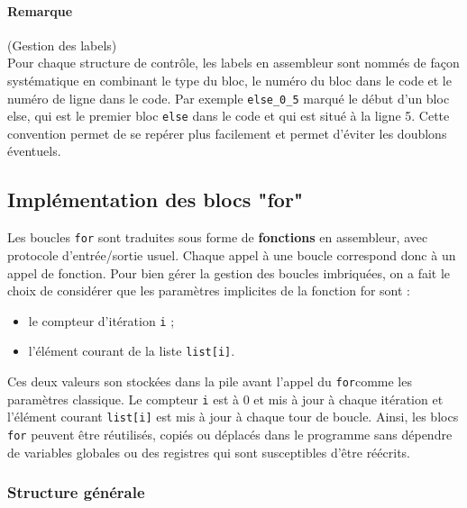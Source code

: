 \documentclass[a4paper, 12pt]{report}
\begin{document}
\paragraph*{Remarque}(Gestion des labels) \\
Pour chaque structure de contrôle, les labels en assembleur sont nommés de façon systématique en combinant le type du bloc, le numéro du bloc dans le code et le numéro de ligne dans le code. Par exemple \texttt{else\_0\_5} marqué le début d'un bloc else, qui est le premier bloc \texttt{else} dans le code et qui est situé à la ligne 5. Cette convention permet de se repérer plus facilement et permet d'éviter les doublons éventuels.\\

\subsection{Implémentation des blocs "for"}

Les boucles \texttt{for} sont traduites sous forme de \textbf{fonctions} en assembleur, avec protocole d'entrée/sortie usuel. Chaque appel à une boucle correspond donc à un appel de fonction. Pour bien gérer la gestion des boucles imbriquées, on a fait le choix de considérer que les paramètres implicites de la fonction for sont : 

\begin{itemize}
	\item le compteur d'itération \texttt{i} ;
	\item l'élément courant de la liste \texttt{list[i]}.
\end{itemize}
Ces deux valeurs son stockées dans la pile avant l'appel du \texttt{for}comme les paramètres classique. Le compteur \texttt{i} est  à 0 et mis à jour à chaque itération et l'élément courant \texttt{list[i]} est mis à jour à chaque tour de boucle. Ainsi, les blocs \texttt{for} peuvent être réutilisés, copiés ou déplacés dans le programme sans dépendre de variables globales ou des registres qui sont susceptibles d'être réécrits.

\subsubsection{Structure générale}
\end{document}
